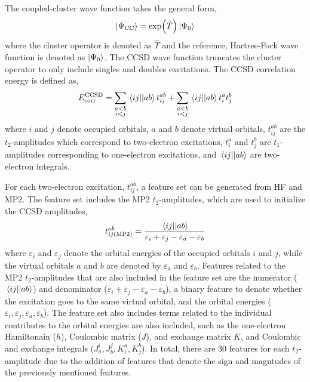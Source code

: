 \documentclass[journal=jacsat,manuscript=article]{achemso}
\begin{document}
The coupled-cluster wave function takes the general form,
\begin{equation}
	\ket{\Psi_{\text{CC}}} = \exp(\hat{T}) \ket{\Psi_{0}}
	\label{eq:cc_wfn}
\end{equation}
where the cluster operator is denoted as $\hat{T}$ and the reference, Hartree-Fock wave function is denoted as $\ket{\Psi_{0}}$.
The CCSD wave function truncates the cluster operator to only include singles and doubles excitations.
The CCSD correlation energy is defined as,
\begin{equation}
	E^{\text{CCSD}}_{\text{corr}} = \sum_{\substack{a<b \\ i<j}} \mel{ij}{}{ab} t^{ab}_{ij} + \sum_{\substack{a<b \\ i<j}} \mel{ij}{}{ab} t^{a}_{i} t^{b}_{j}
	\label{eq:cc_corr}
\end{equation}
where $i$ and $j$ denote occupied orbitals, $a$ and $b$ denote virtual orbitals, $t^{ab}_{ij}$ are the $t_{2}$-amplitudes which correspond to two-electron excitations, 
$t^{a}_{i}$ and $t^{b}_{j}$ are $t_{1}$-amplitudes corresponding to one-electron excitations, and $\mel{ij}{}{ab}$ are two-electron integrals.

For each two-electron excitation, $t^{ab}_{ij}$, a feature set can be generated from HF and MP2.
The feature set includes the MP2 $t_{2}$-amplitudes, which are used to initialize the CCSD amplitudes,
\begin{equation}
	t^{ab}_{ij(\text{MP2})} = \frac{\mel{ij}{}{ab}}{\varepsilon_{i}+\varepsilon_{j}-\varepsilon_{a}-\varepsilon_{b}}
	\label{eq:MP2_t2}
\end{equation}
where $\varepsilon_{i}$ and $\varepsilon_{j}$ denote the orbital energies of the occupied orbitals $i$ and $j$, while the virtual orbitals $a$ and $b$ are denoted by $\varepsilon_{a}$ and $\varepsilon_{b}$.
Features related to the MP2 $t_{2}$-amplitudes that are also included in the feature set are the numerator ($\mel{ij}{}{ab}$) and denominator ($\varepsilon_{i}+\varepsilon_{j}-\varepsilon_{a}-\varepsilon_{b}$), a binary feature to denote whether the excitation goes to the same virtual orbital, and the orbital energies ($\varepsilon_{i},\varepsilon_{j},\varepsilon_{a},\varepsilon_{b}$).
The feature set also includes terms related to the individual contributes to the orbital energies are also included, such as the one-electron Hamiltonain ($h$), Coulombic matrix ($J$), and exchange matrix $K$, and Coulombic and exchange integrals ($J^{i}_{a},J^{j}_{b},K^{a}_{i},K^{b}_{j}$).
In total, there are 30 features for each $t_{2}$-amplitude due to the addition of features that denote the sign and magntudes of the previously mentioned features.
\end{document}
